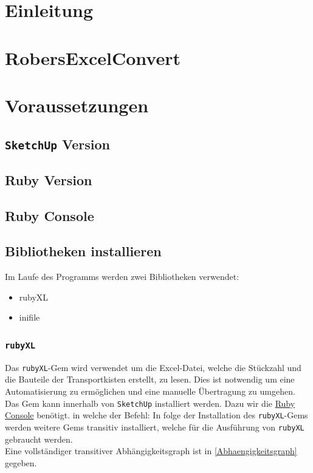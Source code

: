 \documentclass{book}
\newcommand{\sketchup}{\texttt{SketchUp}\xspace}
\newcommand{\rubyXL}{\texttt{rubyXL}\xspace}
\begin{document}
	
	
	
	\tableofcontents
	\chapter{Einleitung}
	
	\chapter{RobersExcelConvert}
	\chapter{Voraussetzungen}
		\section{\sketchup Version}
		\section{Ruby Version}
		\section{Ruby Console} \label{Ruby Console}
		\section{Bibliotheken installieren} \label{Installation}
			Im Laufe des Programms werden zwei Bibliotheken verwendet:\\
			\begin{itemize}
				\item[] rubyXL
				\item[] inifile
			\end{itemize}		
				
			\subsection{\rubyXL} \label{rubyXL}
				Das \rubyXL-Gem wird verwendet um die Excel-Datei, welche die Stückzahl und die Bauteile der Transportkisten erstellt, zu lesen. Dies ist notwendig um eine Automatisierung zu ermöglichen und eine manuelle Übertragung zu umgehen.\\
				Das Gem kann innerhalb von \sketchup installiert werden. Dazu wir die \hyperref[Ruby Console]{Ruby Console} benötigt. in welche der Befehl:
				\hspace*{2cm}
				In folge der Installation des \rubyXL-Gems werden weitere Gems transitiv installiert, welche für die Ausführung von \rubyXL gebraucht werden.\\
				Eine vollständiger transitiver Abhängigkeitsgraph ist in \ref{Abhaengigkeitsgraph} gegeben.
\end{document}

